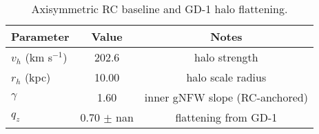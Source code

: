 
\begin{table}[t]
\centering
\caption{Axisymmetric RC baseline and GD-1 halo flattening.}
\begin{tabular}{lcc}
\hline
Parameter & Value & Notes \\
\hline
$v_h$ (km s$^{-1}$) & 202.6 & halo strength \\
$r_h$ (kpc) & 10.00 & halo scale radius \\
$\gamma$ & 1.60 & inner gNFW slope (RC-anchored) \\
$q_z$ & 0.70 $\pm$ nan & flattening from GD-1 \\
\hline
\end{tabular}
\end{table}
